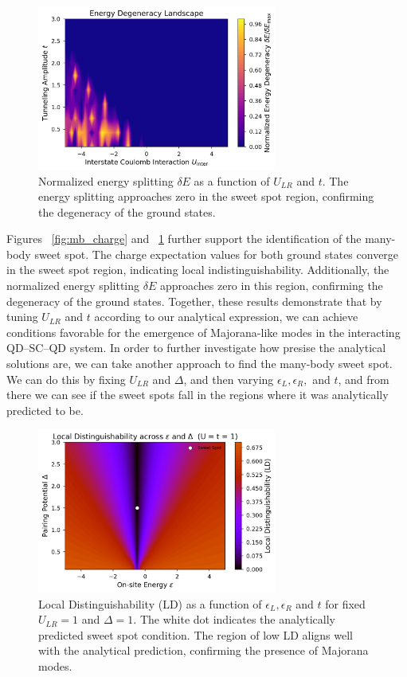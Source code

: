 \documentclass[11pt, letterpaper, titlepage]{article}
\begin{document}
\begin{figure}
  \centering
  \includegraphics[width=0.7\textwidth]{../Figures/degen_mb.png}
  \caption{Normalized energy splitting $\delta E$ as a function of $U_{LR}$ and $t$. The energy splitting approaches zero in the sweet spot region, confirming the degeneracy of the ground states.}
  \label{fig:mb_deltaE}
\end{figure}
Figures ~\ref{fig:mb_charge} and ~\ref{fig:mb_deltaE} further support the identification of the many-body sweet spot. The charge expectation values for both ground states converge in the sweet spot region, indicating local indistinguishability. Additionally, the normalized energy splitting $\delta E$ approaches zero in this region, confirming the degeneracy of the ground states. Together, these results demonstrate that by tuning $U_{LR}$ and $t$ according to our analytical expression, we can achieve conditions favorable for the emergence of Majorana-like modes in the interacting QD–SC–QD system.
\newpage
In order to further investigate how presise the analytical solutions are, we can take another approach to find the many-body sweet spot. We can do this by fixing $U_{LR}$ and $Δ$, and then varying $ϵ_L, ϵ_R,$ and $t$, and from there we can see if the sweet spots fall in the regions where it was analytically predicted to be.\\
\begin{figure}[htbp]
  \centering
  \includegraphics[width=0.7\textwidth]{../Figures/LD_anal.png}
  \caption{Local Distinguishability (LD) as a function of $ϵ_L,ϵ_R$ and $t$ for fixed $U_{LR} = 1$ and $Δ = 1$. The white dot indicates the analytically predicted sweet spot condition. The region of low LD aligns well with the analytical prediction, confirming the presence of Majorana modes.}
  \label{fig:mb_LD_anal}
\end{figure}
\end{document}
